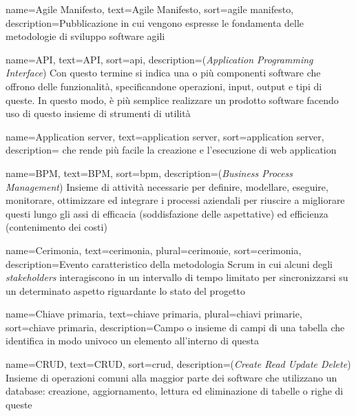 \renewcommand{\glossaryname}{Glossario}

{
    name={Agile Manifesto},
    text=Agile Manifesto,
    sort=agile manifesto,
    description={Pubblicazione in cui vengono espresse le fondamenta delle metodologie di sviluppo software agili}
}

{
    name={API},
    text=API,
    sort=api,
    description={(\emph{Application Programming Interface}) Con questo termine si indica una o più componenti software che offrono delle funzionalità, specificandone operazioni, input, output e tipi di queste. In questo modo, è più semplice realizzare un prodotto software facendo uso di questo insieme di strumenti di utilità}
}

{
    name={Application server},
    text=application server,
    sort=application server,
    description={ che rende più facile la creazione e l'esecuzione di web application}
}

{
    name={BPM},
    text=BPM,
    sort=bpm,
    description={(\emph{Business Process Management}) Insieme di attività necessarie per definire, modellare, eseguire, monitorare, ottimizzare ed integrare i processi aziendali per riuscire a migliorare questi lungo gli assi di efficacia (soddisfazione delle aspettative) ed efficienza (contenimento dei costi)}
}

{
    name={Cerimonia},
    text=cerimonia,
    plural=cerimonie,
    sort=cerimonia,
    description={Evento caratteristico della metodologia Scrum in cui alcuni degli \emph{stakeholders} interagiscono in un intervallo di tempo limitato per sincronizzarsi su un determinato aspetto riguardante lo stato del progetto}
}

{
    name={Chiave primaria},
    text=chiave primaria,
    plural=chiavi primarie,
    sort=chiave primaria,
    description={Campo o insieme di campi di una tabella che identifica in modo univoco un elemento all'interno di questa}
}

{
    name={CRUD},
    text=CRUD,
    sort=crud,
    description={(\emph{Create Read Update Delete}) Insieme di operazioni comuni alla maggior parte dei software che utilizzano un database: creazione, aggiornamento, lettura ed eliminazione di tabelle o righe di queste}
}

